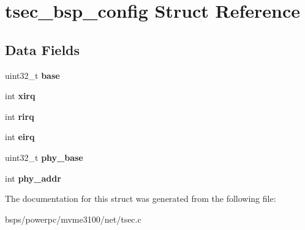 \hypertarget{structtsec__bsp__config}{}\section{tsec\+\_\+bsp\+\_\+config Struct Reference}
\label{structtsec__bsp__config}
\subsection*{Data Fields}
\begin{DoxyCompactItemize}
\item 
\mbox{\label{structtsec__bsp__config_a773e4a6a076da71b4dc87f6db46e72a7}} 
uint32\+\_\+t {\bfseries base}
\item 
\mbox{\label{structtsec__bsp__config_ab187cb841ab57adde68f8f356e99930d}} 
int {\bfseries xirq}
\item 
\mbox{\label{structtsec__bsp__config_a9555bd7952fc4ab88d10e88ed177910a}} 
int {\bfseries rirq}
\item 
\mbox{\label{structtsec__bsp__config_a9913456fbcaf83cb25dd8317c57a6361}} 
int {\bfseries eirq}
\item 
\mbox{\label{structtsec__bsp__config_ac69639a268dd47eeb6ece5ab3fb89979}} 
uint32\+\_\+t {\bfseries phy\+\_\+base}
\item 
\mbox{\label{structtsec__bsp__config_a39d972c52ae43b7a397538e1d994568b}} 
int {\bfseries phy\+\_\+addr}
\end{DoxyCompactItemize}


The documentation for this struct was generated from the following file\+:\begin{DoxyCompactItemize}
\item 
bsps/powerpc/mvme3100/net/tsec.\+c\end{DoxyCompactItemize}
